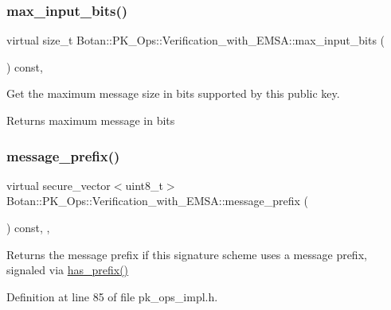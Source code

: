 \subsubsection{\texorpdfstring{max\+\_\+input\+\_\+bits()}{max\_input\_bits()}}
{\footnotesize\ttfamily virtual size\+\_\+t Botan\+::\+P\+K\+\_\+\+Ops\+::\+Verification\+\_\+with\+\_\+\+E\+M\+S\+A\+::max\+\_\+input\+\_\+bits (\begin{DoxyParamCaption}{ }\end{DoxyParamCaption}) const\hspace{0.3cm}{\ttfamily [protected]}, {}}

Get the maximum message size in bits supported by this public key. \begin{DoxyReturn}{Returns}
maximum message in bits 
\end{DoxyReturn}
\mbox{\label{class_botan_1_1_p_k___ops_1_1_verification__with___e_m_s_a_a0a610d689e3156019bbaf55e73f90128}} 
\subsubsection{\texorpdfstring{message\+\_\+prefix()}{message\_prefix()}}
{\footnotesize\ttfamily virtual secure\+\_\+vector$<$uint8\+\_\+t$>$ Botan\+::\+P\+K\+\_\+\+Ops\+::\+Verification\+\_\+with\+\_\+\+E\+M\+S\+A\+::message\+\_\+prefix (\begin{DoxyParamCaption}{ }\end{DoxyParamCaption}) const\hspace{0.3cm}{\ttfamily [inline]}, {\ttfamily [protected]}, {\ttfamily [virtual]}}

\begin{DoxyReturn}{Returns}
the message prefix if this signature scheme uses a message prefix, signaled via \mbox{\hyperlink{class_botan_1_1_p_k___ops_1_1_verification__with___e_m_s_a_a8671e55d073dfcd21b837be2de9fa0ec}{has\+\_\+prefix()}} 
\end{DoxyReturn}


Definition at line 85 of file pk\+\_\+ops\+\_\+impl.\+h.

